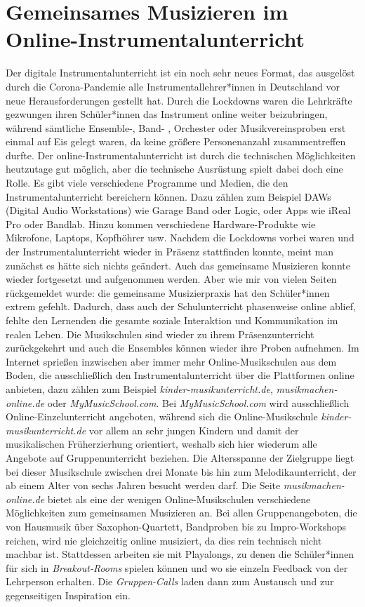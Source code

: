 \section{Gemeinsames Musizieren im Online-Instrumentalunterricht}

Der digitale Instrumentalunterricht ist ein noch sehr neues Format, das
ausgelöst durch die Corona-Pandemie alle Instrumentallehrer*innen in Deutschland
vor neue Herausforderungen gestellt hat. Durch die Lockdowns waren die
Lehrkräfte gezwungen ihren Schüler*innen das Instrument online weiter
beizubringen, während sämtliche Ensemble-, Band- , Orchester oder
Musikvereinsproben erst einmal auf Eis gelegt waren, da keine größere
Personenanzahl zusammentreffen durfte. Der online-Instrumentalunterricht ist
durch die technischen Möglichkeiten heutzutage gut möglich, aber die technische
Ausrüstung spielt dabei doch eine Rolle. Es gibt viele verschiedene Programme
und Medien, die den Instrumentalunterricht bereichern können. Dazu zählen zum
Beispiel DAWs (Digital Audio Workstations) wie Garage Band oder Logic, oder Apps
wie iReal Pro oder Bandlab. Hinzu kommen verschiedene
Hardware-Produkte wie Mikrofone, Laptops, Kopfhöhrer usw. Nachdem
die Lockdowns vorbei waren und der Instrumentalunterricht wieder in
Präsenz stattfinden konnte, meint man zunächst es hätte sich nichts geändert.
Auch das gemeinsame Musizieren konnte wieder fortgesetzt und aufgenommen werden.
Aber wie mir von vielen Seiten rückgemeldet wurde: die gemeinsame Musizierpraxis
hat den Schüler*innen extrem gefehlt. Dadurch, dass auch der Schulunterricht
phasenweise online ablief, fehlte den Lernenden die gesamte soziale Interaktion
und Kommunikation im realen Leben. Die Musikschulen sind wieder zu ihrem
Präsenzunterricht zurückgekehrt und auch die Ensembles können wieder ihre Proben
aufnehmen. Im Internet sprießen inzwischen aber immer mehr Online-Musikschulen
aus dem Boden, die ausschließlich den Instrumentalunterricht über die
Plattformen online anbieten, dazu zählen zum Beispiel
\emph{kinder-musikunterricht.de}, \emph{musikmachen-online.de} oder
\emph{MyMusicSchool.com}. Bei \emph{MyMusicSchool.com} wird ausschließlich
Online-Einzelunterricht angeboten, während sich die Online-Musikschule
\emph{kinder-musikunterricht.de} vor allem an sehr jungen Kindern und damit der
musikalischen Früherzierhung orientiert, weshalb sich hier wiederum alle
Angebote auf Gruppenunterricht beziehen. Die Altersspanne der Zielgruppe liegt
bei dieser Musikschule zwischen drei Monate bis hin zum Melodikaunterricht, der
ab einem Alter von sechs Jahren besucht werden darf.
\autocite{online_musikschule_emp} Die Seite \emph{musikmachen-online.de} bietet
als eine der wenigen Online-Musikschulen verschiedene Möglichkeiten zum
gemeinsamen Musizieren an. \autocite{online_musikschule_mmo} Bei allen
Gruppenangeboten, die von Hausmusik über Saxophon-Quartett, Bandproben bis zu
Impro-Workshops reichen, wird nie gleichzeitig online musiziert, da dies rein
technisch nicht machbar ist. Stattdessen arbeiten sie mit Playalongs, zu denen
die Schüler*innen für sich in \emph{Breakout-Rooms} spielen können und wo sie
einzeln Feedback von der Lehrperson erhalten. Die \emph{Gruppen-Calls} laden
dann zum Austausch und zur gegenseitigen Inspiration ein.
\autocite{online_musikschule_mmo}




